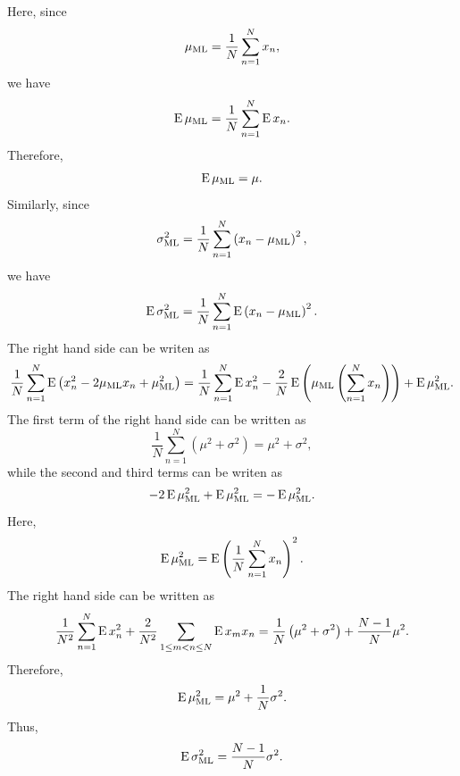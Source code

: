 Here, since 
%
\begin{equation}
\mu_{\rm ML} 
= 
\frac{1}{N} 
\sum_{n = 1}^{N} 
x_n,
\end{equation}
%
we have
%
\begin{equation}
\operatorname{E} \mu_{\rm ML} 
= 
\frac{1}{N} 
\sum_{n = 1}^{N} 
\operatorname{E} x_n.
\end{equation}
%
Therefore, 
%
\begin{equation}
\operatorname{E} \mu_{\rm ML} 
= 
\mu.
\end{equation}
%
Similarly, since 
%
\begin{equation}
\sigma_{\rm ML}^2 
= 
\frac{1}{N} 
\sum_{n = 1}^{N} 
\left( 
	x_n 
	- 
	\mu_{\rm ML} 
\right) ^ 2,
\end{equation}
%
we have 
%
\begin{equation}
\operatorname{E} \sigma_{\rm ML}^2 
= 
\frac{1}{N} 
\sum_{n = 1}^{N} 
\operatorname{E} 
\left( 
	x_n 
	- 
	\mu_{\rm ML} 
\right) ^ 2.
\end{equation}
%
The right hand side can be writen as 
%
\begin{equation}
\frac{1}{N} 
\sum_{n = 1}^{N} 
\operatorname{E} 
\left( 
	x_n ^ 2 
	- 
	2 \mu_{\rm ML} x_n 
	+ 
	\mu_{\rm ML} ^ 2 
\right) 
= 
\frac{1}{N} 
\sum_{n = 1}^{N} 
\operatorname{E} x_n ^ 2 
- 
\frac{2}{N} 
\operatorname{E} 
\left( 
	\mu_{\rm ML} 
	\left( 
		\sum_{n = 1}^{N} 
		x_n 
	\right) 
\right) 
+ 
\operatorname{E} \mu_{\rm ML} ^ 2.
\end{equation}
%
The first term of the right hand side can be written as 
%
\begin{equation}
\frac{1}{N}
\sum_{n = 1}^{N} 
\left( 
	\mu ^ 2 
	+ 
	\sigma ^ 2 
\right) 
= 
\mu ^ 2 
+ 
\sigma ^ 2,
\end{equation}
%
while the second and third terms can be writen as
%
\begin{equation}
- 
2 
\operatorname{E} \mu_{\rm ML} ^ 2 
+ 
\operatorname{E} \mu_{\rm ML} ^ 2 
= 
- 
\operatorname{E} \mu_{\rm ML} ^ 2.
\end{equation}
%
Here, 
%
\begin{equation}
\operatorname{E} \mu_{\rm ML} ^ 2 
= 
\operatorname{E} 
\left( 
	\frac{1}{N} 
	\sum_{n = 1}^{N} x_n 
\right) ^ 2.
\end{equation}
%
The right hand side can be written as 
%
\begin{equation}
\frac{1}{N ^ 2} 
\sum_{n = 1}^{N} 
\operatorname{E} x_n ^ 2 
+ 
\frac{2}{N ^ 2} 
\sum_{1 \leq m < n \leq N} 
\operatorname{E} x_m x_n 
= 
\frac{1}{N} 
\left(
	\mu ^ 2 
	+ 
	\sigma ^ 2
\right) 
+ 
\frac{N - 1}{N} 
\mu ^ 2.
\end{equation}
%
Therefore,
%
\begin{equation}
\operatorname{E} \mu_{\rm ML} ^ 2 
= 
\mu ^ 2 
+ 
\frac{1}{N} \sigma ^ 2.
\end{equation}
%
Thus,
%
\begin{equation}
\operatorname{E} \sigma_{\rm ML}^2 
= 
\frac{N - 1}{N} \sigma ^ 2.
\end{equation}
%


